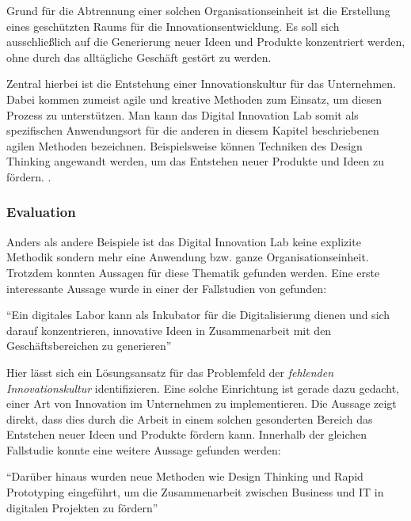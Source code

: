 Grund für die Abtrennung einer solchen Organisationseinheit ist die Erstellung eines geschützten Raums für die Innovationsentwicklung. Es soll sich ausschließlich auf die Generierung neuer Ideen und Produkte konzentriert werden, ohne durch das alltägliche Geschäft gestört zu werden.

Zentral hierbei ist die Entstehung einer Innovationskultur für das Unternehmen. Dabei kommen zumeist agile und kreative Methoden zum Einsatz, um diesen Prozess zu unterstützen. Man kann das Digital Innovation Lab somit als spezifischen Anwendungsort für die anderen in diesem Kapitel beschriebenen agilen Methoden bezeichnen. Beispielsweise  können Techniken des Design Thinking angewandt werden, um das Entstehen neuer Produkte und Ideen zu fördern. \cite{meyer_innovation_nodate}.


\subsubsection{Evaluation}

Anders als andere Beispiele ist das Digital Innovation Lab keine explizite Methodik sondern mehr eine Anwendung bzw. ganze Organisationseinheit. Trotzdem konnten Aussagen für diese Thematik gefunden werden. Eine erste interessante Aussage wurde in einer der Fallstudien von  gefunden:

\begin{center}
	``Ein digitales Labor kann als Inkubator für die Digitalisierung dienen und sich darauf konzentrieren, innovative Ideen in Zusammenarbeit mit den Geschäftsbereichen zu generieren'' \cite[S. 266]{urbach_digitalization_2018}
\end{center}

Hier lässt sich ein Lösungsansatz für das Problemfeld der \textit{fehlenden Innovationskultur} identifizieren. Eine solche Einrichtung ist gerade dazu gedacht, einer Art von Innovation im Unternehmen zu  implementieren. Die Aussage zeigt direkt, dass dies durch die Arbeit in einem solchen gesonderten Bereich das Entstehen neuer Ideen und Produkte fördern kann. Innerhalb der gleichen Fallstudie konnte eine weitere Aussage gefunden werden:

\begin{center}
	``Darüber hinaus wurden neue Methoden wie Design Thinking und Rapid Prototyping eingeführt, um die Zusammenarbeit zwischen Business und IT in digitalen Projekten zu fördern'' \cite[S. 261]{urbach_digitalization_2018}
\end{center}

